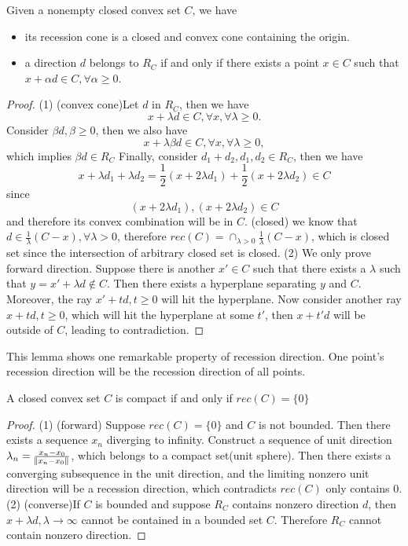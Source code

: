 \begin{refsection}
\begin{lemma}\cite[43]{bertsekas2009convex}\cite{Basu2016introduction}
Given a nonempty closed convex set $C$, we have
\begin{itemize}
    \item its recession cone is a closed and convex cone containing the origin.
    \item a direction $d$ belongs to $R_C$ if and only if there exists a point $x\in C$ such that $x + \alpha d \in C, \forall \alpha \geq 0$.
\end{itemize}
\end{lemma}
\begin{proof}
(1) (convex cone)Let $d$ in $R_C$, then we have 
	$$x+\lambda d \in C,\forall x,\forall \lambda \geq 0.$$
	Consider $\beta d,\beta \geq 0$, then we also have
	$$x+\lambda \beta d \in C,\forall x,\forall \lambda \geq 0,$$
	which implies $\beta d\in R_C$
	Finally, consider $d_1 + d_2, d_1,d_2\in R_C$, then
	we have 
	$$x + \lambda d_1 + \lambda d_2 = \frac{1}{2}(x + 2\lambda d_1) + \frac{1}{2}(x + 2\lambda d_2) \in C$$
	since
	$$(x + 2\lambda d_1), (x + 2\lambda d_2) \in C$$
	and therefore its convex combination will be in $C$.
	(closed) we know that $d \in \frac{1}{\lambda} (C-x), \forall \lambda >0$, therefore
	$rec(C) = \cap_{\lambda > 0} \frac{1}{\lambda} (C-x)$, which is closed set since the intersection of arbitrary closed set is closed.
(2) We only prove forward direction. Suppose there is another $x'\in C$ such that there exists a $\lambda$ such that $y = x' + \lambda d \notin C$. Then there exists a hyperplane separating $y$ and $C$. Moreover, the ray $x'+td,t\geq 0$ will hit the hyperplane. Now consider another ray $x+td,t\geq 0$, which will hit the hyperplane at some $t'$, then $x+t'd$ will be outside of $C$, leading to contradiction.
\end{proof}

\begin{remark}
This lemma shows one remarkable property of recession direction. One point's recession direction will be the recession direction of all points.
\end{remark}

\begin{theorem}\cite{Basu2016introduction}
	A closed convex set $C$ is compact if and only if $rec(C) = \{0\}$
\end{theorem}
\begin{proof}
(1) (forward) Suppose $rec(C)=\{0\}$ and $C$ is not bounded. Then there exists a sequence $x_n$ diverging to infinity. Construct a sequence of unit direction $\lambda_n = \frac{x_n-x_0}{\norm{x_n-x_0}}$, which belongs to a compact set(unit sphere). Then there exists a converging subsequence in the unit direction, and the limiting nonzero unit direction will be a recession direction, which contradicts $rec(C)$ only contains $0$.
(2) (converse)If $C$ is bounded and suppose $R_C$ contains nonzero direction $d$, then $x + \lambda d,\lambda \to \infty$ cannot be contained in a bounded set $C$. Therefore $R_C$ cannot contain nonzero direction.
\end{proof}




\end{refsection}
